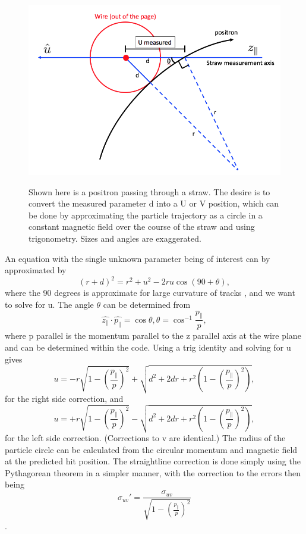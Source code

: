\documentclass{article}
\begin{document}
\begin{figure}[h]
\caption{Shown here is a positron passing through a straw. The desire is to convert the measured parameter d into a U or V position, which can be done by approximating the particle trajectory as a circle in a constant magnetic field over the course of the straw and using trigonometry. Sizes and angles are exaggerated.}
\centering
\includegraphics[width=1.0\textwidth]{angularCorrection}
\label{fig:angularCorrection}
\end{figure}

An equation with the single unknown parameter being of interest can by approximated by
$$(r+d)^{2} = r^{2}+u^{2}-2ru\cos(90+\theta),$$ where the 90 degrees is approximate for large curvature of tracks , and we want to solve for u. The angle $\theta$ can be determined from 
$$\hat{z_{\parallel}} \cdot \hat{p_{\parallel}} = \cos{\theta}, \theta = \cos^{-1}{\frac{p_{\parallel}}{p}},$$ where p parallel is the momentum parallel to the z parallel axis at the wire plane and can be determined within the code. Using a trig identity and solving for u gives
$$u = -r\sqrt{1-(\frac{p_{\parallel}}{p})^{2}} + \sqrt{d^{2} + 2dr + r^{2}(1-(\frac{p_{\parallel}}{p})^{2})},$$ for the right side correction, and 
$$u = +r\sqrt{1-(\frac{p_{\parallel}}{p})^{2}} - \sqrt{d^{2} + 2dr + r^{2}(1-(\frac{p_{\parallel}}{p})^{2})},$$ for the left side correction. (Corrections to v are identical.) The radius of the particle circle can be calculated from the circular momentum and magnetic field at the predicted hit position. The straightline correction is done simply using the Pythagorean theorem in a simpler manner, with the correction to the errors then being
$$\sigma_{uv}' = \frac{\sigma_{uv}}{\sqrt{1-(\frac{p_{\parallel}}{p})^{2}}}$$.
\end{document}
